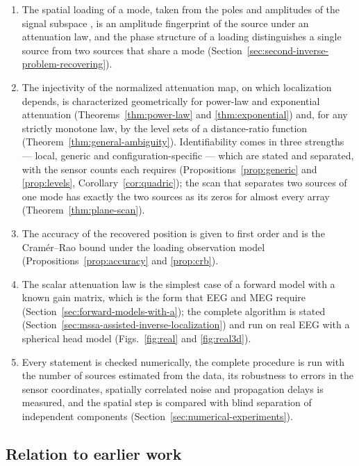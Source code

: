 \documentclass{article}
\begin{document}
\begin{enumerate}
\item
  The spatial loading of a mode, taken from the poles and amplitudes of the signal subspace \cite{ref-companionA}, is an amplitude fingerprint of the source under an attenuation law, and the phase structure of a loading distinguishes a single source from two sources that share a mode (Section~\ref{sec:second-inverse-problem-recovering}).
\item
  The injectivity of the normalized attenuation map, on which localization depends, is characterized geometrically for power-law and exponential attenuation (Theorems~\ref{thm:power-law} and \ref{thm:exponential}) and, for any strictly monotone law, by the level sets of a distance-ratio function (Theorem~\ref{thm:general-ambiguity}). Identifiability comes in three strengths --- local, generic and configuration-specific --- which are stated and separated, with the sensor counts each requires (Propositions~\ref{prop:generic} and \ref{prop:levels}, Corollary~\ref{cor:quadric}); the scan that separates two sources of one mode has exactly the two sources as its zeros for almost every array (Theorem~\ref{thm:plane-scan}).
\item
  The accuracy of the recovered position is given to first order and is the Cram\'er--Rao bound under the loading observation model (Propositions~\ref{prop:accuracy} and \ref{prop:crb}).
\item
  The scalar attenuation law is the simplest case of a forward model with a known gain matrix, which is the form that EEG and MEG require (Section~\ref{sec:forward-models-with-a}); the complete algorithm is stated (Section~\ref{sec:mssa-assisted-inverse-localization}) and run on real EEG with a spherical head model (Figs.~\ref{fig:real} and \ref{fig:real3d}).
\item
  Every statement is checked numerically, the complete procedure is run with the number of sources estimated from the data, its robustness to errors in the sensor coordinates, spatially correlated noise and propagation delays is measured, and the spatial step is compared with blind separation of independent components (Section~\ref{sec:numerical-experiments}).
\end{enumerate}

\subsection{Relation to earlier work}\label{sec:relation-to-earlier-work}
\end{document}
